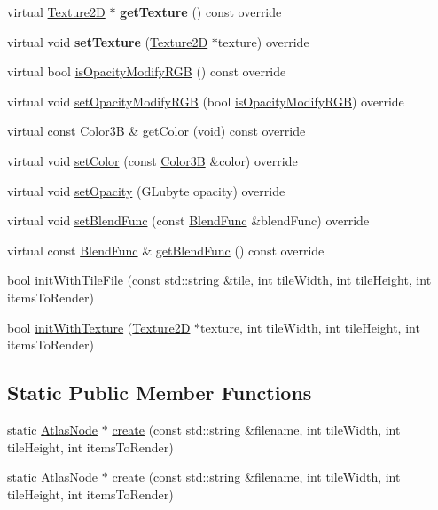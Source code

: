 \begin{DoxyCompactItemize}
virtual \hyperlink{classTexture2D}{Texture2D} $\ast$ {\bfseries get\+Texture} () const override
\item 
\mbox{\label{classAtlasNode_a3de1c824725c066aec2d58a2274f6845}} 
virtual void {\bfseries set\+Texture} (\hyperlink{classTexture2D}{Texture2D} $\ast$texture) override
\item 
virtual bool \hyperlink{classAtlasNode_ad7d0c0a791719739d15e4f07c75f6704}{is\+Opacity\+Modify\+R\+GB} () const override
\item 
virtual void \hyperlink{classAtlasNode_ab9dacc4ad5e4701ff0a531605f2d1f11}{set\+Opacity\+Modify\+R\+GB} (bool \hyperlink{classAtlasNode_a3aa161e8abaff7422b7f9ef895f9439d}{is\+Opacity\+Modify\+R\+GB}) override
\item 
virtual const \hyperlink{structColor3B}{Color3B} \& \hyperlink{classAtlasNode_a2921f746aab7922633bcd18790619e75}{get\+Color} (void) const override
\item 
virtual void \hyperlink{classAtlasNode_a4205343f55700284ffba22a2988c5445}{set\+Color} (const \hyperlink{structColor3B}{Color3B} \&color) override
\item 
virtual void \hyperlink{classAtlasNode_af95a54e5d5157983414cad3d837853eb}{set\+Opacity} (G\+Lubyte opacity) override
\item 
virtual void \hyperlink{classAtlasNode_a3b718d1de3a8763fc3bfbab137f542de}{set\+Blend\+Func} (const \hyperlink{structBlendFunc}{Blend\+Func} \&blend\+Func) override
\item 
virtual const \hyperlink{structBlendFunc}{Blend\+Func} \& \hyperlink{classAtlasNode_a23f13b43d776ea8d280d581847244b1a}{get\+Blend\+Func} () const override
\item 
bool \hyperlink{classAtlasNode_a70804bf430d042bb94a6e2b18c47d7f2}{init\+With\+Tile\+File} (const std\+::string \&tile, int tile\+Width, int tile\+Height, int items\+To\+Render)
\item 
bool \hyperlink{classAtlasNode_a2d9f1166a53720d7ac48ab665c847604}{init\+With\+Texture} (\hyperlink{classTexture2D}{Texture2D} $\ast$texture, int tile\+Width, int tile\+Height, int items\+To\+Render)
\end{DoxyCompactItemize}
\subsection*{Static Public Member Functions}
\begin{DoxyCompactItemize}
\item 
static \hyperlink{classAtlasNode}{Atlas\+Node} $\ast$ \hyperlink{classAtlasNode_a34f6cb836619df9e64c1915c67512b03}{create} (const std\+::string \&filename, int tile\+Width, int tile\+Height, int items\+To\+Render)
\item 
static \hyperlink{classAtlasNode}{Atlas\+Node} $\ast$ \hyperlink{classAtlasNode_a5b604375a0603a3ae0ef21682fdac499}{create} (const std\+::string \&filename, int tile\+Width, int tile\+Height, int items\+To\+Render)
\end{DoxyCompactItemize}
